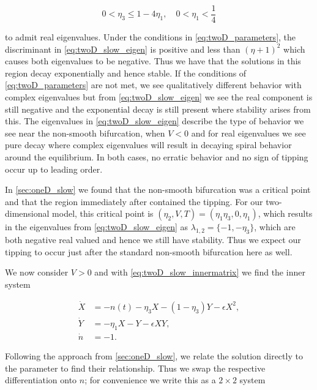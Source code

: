 \begin{equation}\label{eq:twoD_parameters}
0<\eta_3\le 1-4\eta_1,\quad 0<\eta_1<\frac{1}{4}
\end{equation}

to admit real eigenvalues. Under the conditions in \eqref{eq:twoD_parameters}, the discriminant in \eqref{eq:twoD_slow_eigen} is positive and less than ${(\eta+1)^2}$ which causes both eigenvalues to be negative. Thus we have that the solutions in this region decay exponentially and hence stable. If the conditions of \eqref{eq:twoD_parameters} are not met, we see qualitatively different behavior with complex eigenvalues but from \eqref{eq:twoD_slow_eigen} we see the real component is still negative and the exponential decay is still present where stability arises from this. The eigenvalues in \eqref{eq:twoD_slow_eigen} describe the type of behavior we see near the non-smooth bifurcation, when $V<0$ and for real eigenvalues we see pure decay where complex eigenvalues will result in decaying spiral behavior around the equilibrium. In both cases, no erratic behavior and no sign of tipping occur up to leading order.

In \autoref{sec:oneD_slow} we found that the non-smooth bifurcation was a critical point and that the region immediately after contained the tipping. For our two-dimensional model, this critical point is $(\eta_2,V,T)=(\eta_1\eta_3,0,\eta_1)$, which results in the eigenvalues from \eqref{eq:twoD_slow_eigen} as $\lambda_{1,2}=\{-1,-\eta_3\}$, which are both negative real valued and hence we still have stability. Thus we expect our tipping to occur just after the standard non-smooth bifurcation here as well.

We now consider $V>0$ and with \eqref{eq:twoD_slow_innermatrix} we find the inner system

\begin{equation}\label{eq:twoD_slow_positiveinner}
 \begin{aligned}
   \dot{X} & =  -n(t)-\eta_3 X-(1-\eta_3)Y-\epsilon X^2, \\
   \dot{Y} & =  -\eta_1 X-Y-\epsilon XY,  \\
  \dot{n}  & =  -1.
  \end{aligned}
\end{equation}

Following the approach from \autoref{sec:oneD_slow}, we relate the solution directly to the parameter to find their relationship. Thus we swap the respective differentiation onto $n$; for convenience we write this as a $2\times 2$ system


